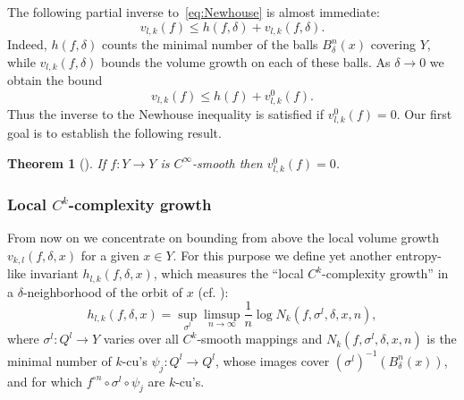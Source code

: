 \documentclass[reqno]{amsart}
\newtheorem{Thm}{Theorem}{\bfseries}{\itshape}
\renewcommand\~[1]{\widetilde{#1}}
\begin{document}
The following partial inverse to~\eqref{eq:Newhouse} is
almost immediate:
\begin{equation}
  v_{l,k}(f)\le h(f,\delta)+v_{l,k}(f,\delta).  
\end{equation}
Indeed, $h(f,\delta)$ counts the minimal number of the balls
$B^n_{\delta}(x)$ covering $Y$, while $v_{l,k}(f,\delta)$ bounds the
volume growth on each of these balls. As $\delta\to 0$ we obtain the
bound
\begin{equation}
  v_{l,k}(f)\le h(f)+v^0_{l,k}(f).  
\end{equation}
Thus the inverse to the Newhouse inequality is satisfied if
$v^0_{l,k}(f)=0$. Our first goal is to establish the following result.

\begin{Thm}[]\label{thm:yomdin-Cinf-volume}
  If $f:Y\to Y$ is $C^\infty$-smooth then $v_{l,k}^0(f)=0$.
\end{Thm}



\subsubsection{Local $C^k$-complexity growth}

From now on we concentrate on bounding from above the local volume
growth $v_{k,l}(f,\delta,x)$ for a given $x\in Y$. For this purpose we
define yet another entropy-like invariant $h_{l,k}(f,\delta,x)$, which
measures the ``local $C^k$-complexity growth'' in a
$\delta$-neighborhood of the orbit of $x$
(cf. \cite{gromov:gy,yomdin:entropy-analytic}):
\begin{equation}\label{Ck.local.comp}
  h_{l,k}(f,\delta,x)=\sup_{\sigma^l}\limsup_{n\to \infty}\frac{1}{n}\log N_k(f,\sigma^l,\delta,x,n),
\end{equation}
where $\sigma^l:Q^l\to Y$ varies over all $C^k$-smooth mappings and
$N_k(f,\sigma^l,\delta,x,n)$ is the minimal number of $k$-cu's
$\psi_j:Q^l\to Q^l$, whose images cover
$(\sigma^l)^{-1}(B^n_{\delta}(x))$, and for which
$f^{\circ n}\circ \sigma^l \circ \psi_j$ are $k$-cu's.
\end{document}
